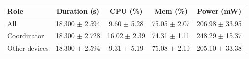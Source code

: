 \begin{tabular}{lcccc}
\hline
\textbf{Role} & \textbf{Duration (s)} & \textbf{CPU (\%)} & \textbf{Mem (\%)} & \textbf{Power (mW)} \\
\hline
All & 18.300 $\pm$ 2.594 & 9.60 $\pm$ 5.28 & 75.05 $\pm$ 2.07 & 206.98 $\pm$ 33.95 \\
Coordinator & 18.300 $\pm$ 2.728 & 16.02 $\pm$ 2.39 & 74.31 $\pm$ 1.11 & 248.29 $\pm$ 15.37 \\
Other devices & 18.300 $\pm$ 2.594 & 9.31 $\pm$ 5.19 & 75.08 $\pm$ 2.10 & 205.10 $\pm$ 33.38 \\
\hline
\end{tabular}
